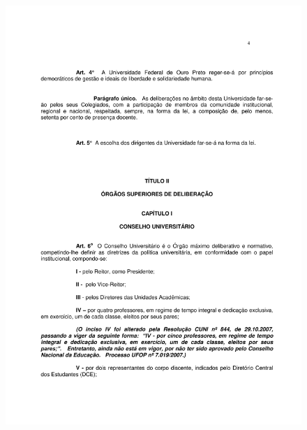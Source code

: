 \begin{figure}[p]
	\centering 
	\includegraphics[scale=0.7]{capitulos/resolucoes/cuni414/cuni414-4.pdf}
\end{figure}


